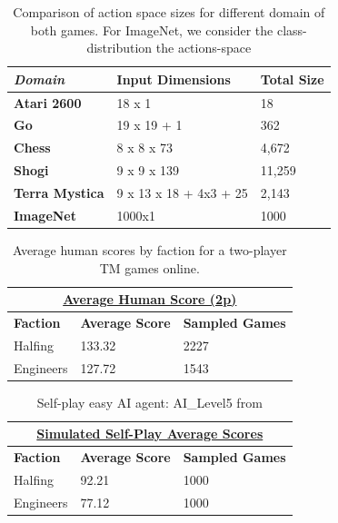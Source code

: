 \documentclass[8pt,twocolumn]{article}
\begin{document}
\begin{table}[h!]
\begin{tabular}{|l|l|l|}
\hline
\textit{\textbf{Domain}} & \textbf{Input Dimensions} & \textbf{Total Size} \\ \hline
\textbf{Atari 2600}      & 18 x 1               & 18              \\ \hline
\textbf{Go}              & 19 x 19 + 1              & 362               \\ \hline
\textbf{Chess}           & 8 x 8 x 73               & 4,672               \\ \hline
\textbf{Shogi}           & 9 x 9 x 139               & 11,259              \\ \hline
\textbf{Terra Mystica}   & 9 x 13 x 18 + 4x3 + 25 &   2,143            \\ \hline
\textbf{ImageNet}        & 1000x1                 & 1000              \\ \hline
\end{tabular}
\caption{Comparison of action space sizes for different domain of both games. For ImageNet, we consider the class-distribution the actions-space}
\label{table:output_size_comparison}
\end{table}


\begin{table}[h!]
\begin{tabular}{|l|l|l|}
\hline
\multicolumn{3}{|c|}{{\ul \textbf{Average Human Score (2p)}}}      \\ \hline
\textbf{Faction} & \textbf{Average Score} & \textbf{Sampled Games} \\ \hline
Halfing          & 133.32                 & 2227                   \\ \hline
Engineers        & 127.72                 & 1543                   \\ \hline
\end{tabular}
\caption{Average human scores by faction for a two-player TM games online.}
\label{table:average_2p_score}
\end{table}

\begin{table}[h!]
\begin{tabular}{|l|l|l|}
\hline
\multicolumn{3}{|c|}{{\ul \textbf{Simulated Self-Play Average Scores}}}      \\ \hline
\textbf{Faction} & \textbf{Average Score} & \textbf{Sampled Games} \\ \hline
Halfing          & 92.21                 & 1000                   \\ \hline
Engineers        & 77.12                 & 1000                   \\ \hline
\end{tabular}
\caption{Self-play easy AI agent: AI\_Level5 from \cite{TMStatsAI}}
\label{table:average_2p_score}
\end{table}
\end{document}
